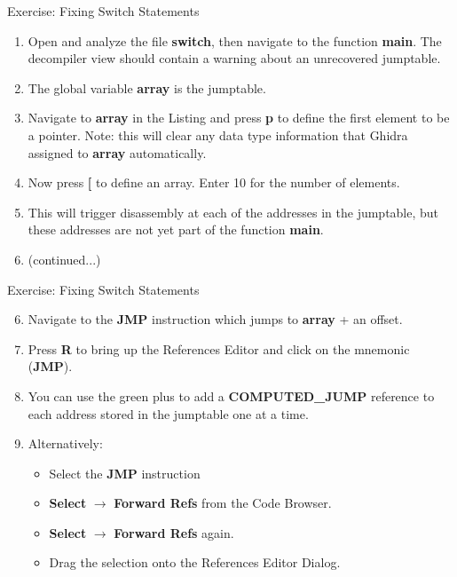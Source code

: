 \documentclass{beamer}
\begin{document}
\begin{frame}
\begin{block}{Exercise: Fixing Switch Statements}
\begin{enumerate}
\item Open and analyze the file \textbf{switch}, then navigate to the function \textbf{main}. The decompiler view should contain a warning about an unrecovered jumptable.
\item The global variable \textbf{array} is the jumptable. 
\item Navigate to \textbf{array} in the Listing and press \textbf{p} to define the first element to be a pointer.  Note: this will clear any data type information that Ghidra assigned to 
\textbf{array} automatically.
\item Now press \textbf{[} to define an array.  Enter 10 for the number of elements. 
\item This will trigger disassembly at each of the addresses in the jumptable, but these addresses are not yet part of the function \textbf{main}.
\item[] (continued...)
\end{enumerate}
\end{block}
\end{frame}

\begin{frame}
\begin{block}{Exercise: Fixing Switch Statements}
\begin{enumerate}
\setcounter{enumi}{5}
\item Navigate to the \textbf{JMP} instruction which jumps to \textbf{array} + an offset.
\item Press \textbf{R} to bring up the References Editor and click on the mnemonic (\textbf{JMP}).
\item You can use the green plus to add a \textbf{COMPUTED\_JUMP} reference to each address stored in the jumptable one at a time.
\item Alternatively:
\begin{itemize}
\item Select the \textbf{JMP} instruction
\item \textbf{Select} $\rightarrow$ \textbf{Forward Refs} from the Code Browser.
\item \textbf{Select} $\rightarrow$ \textbf{Forward Refs} again.
\item Drag the selection onto the References Editor Dialog.
\end{itemize}
\end{enumerate}
\end{block}
\end{frame}
\end{document}
